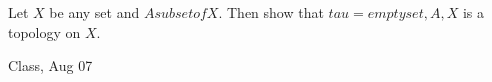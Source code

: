 \begin{samepage}
\begin{ex}
Let $X$ be any set and $A subset of X$. Then show that 
$tau = {{ empty set, A , X }}$ is a topology on $X$.
\end{ex}
\begin{source}
Class, Aug 07
\end{source}
\end{samepage}
